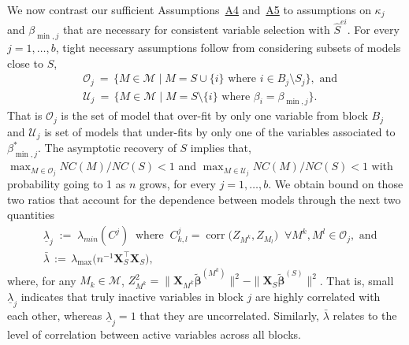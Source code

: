 \documentclass[
  12pt]{article}
\newcommand{\M}{\mathcal{M}}
\newcommand{\OO}{\mathcal{O}}
\newcommand{\U}{\mathcal{U}}
\newcommand{\bbeta}{\boldsymbol{\beta}}
\newcommand{\bX}{\mathbf{X}}
\begin{document}
We now contrast our sufficient Assumptions~\hyperlink{lab:A4}{A4} and~\hyperlink{lab:A5}{A5} to assumptions on $\kappa_j$ and $\beta_{\min,j}$ that are necessary for consistent variable selection with $\hat{S}^{ei}$. For every $j=1,\ldots,b$, tight necessary assumptions follow from considering subsets of models close to $S$,
\begin{align}
    &\OO_j \:=\,\{M\in \M\;|\; M=S\cup\{i\} \text{ where } i\in B_j\setminus S_j\}, \label{eq:defOj} \text{ and}\\
    &\U_j \:=\,\{M\in \M\;|\; M=S\setminus\{i\} \text{ where } \beta_i=\beta_{\min,j}\}.
\end{align}
That is $\OO_j$ is the set of model that over-fit by only one variable from block $B_j$ and $\U_j$ is set of models that under-fits by only one of the variables associated to $\beta_{\min,j}^*$. The asymptotic recovery of $S$ implies that, $\max_{M\in \OO_j}NC(M)/NC(S)<1$ and $\max_{M\in \U_j}NC(M)/NC(S)<1$ with probability going to 1 as $n$ grows, for every $j=1,\ldots,b$. We obtain bound on those two ratios that account for the dependence between models through the next two quantities
\begin{align}
    &\underline{\lambda}_j\;:=\;\lambda_{min}(C^j)\;\;\text{where} \;\;C^j_{k,l}=\operatorname{corr}\big(Z_{M^k},Z_{M_l}\big) \;\;\forall M^k,M^l \in \OO_j \label{eq:ovpsk}, \text{ and}\\
    &\bar{\lambda}\,:=\,\lambda_{\max}\Big(n^{-1} \bX_{S}^\top\bX_{S}\Big),
\end{align}
where, for any $M_k\in \M$, $Z_{M^k}^2=\|\bX_{M^k}\tilde{\bbeta}^{(M^k)}\|^2-\|\bX_{S}\tilde{\bbeta}^{(S)}\|^2$. That is, small $\underline{\lambda}_j$ indicates that truly inactive variables in block $j$ are highly correlated with each other, whereas $\underline{\lambda}_j=1$ that they are uncorrelated. Similarly, $\bar{\lambda}$ relates to the level of correlation between active variables across all blocks. 
\end{document}
